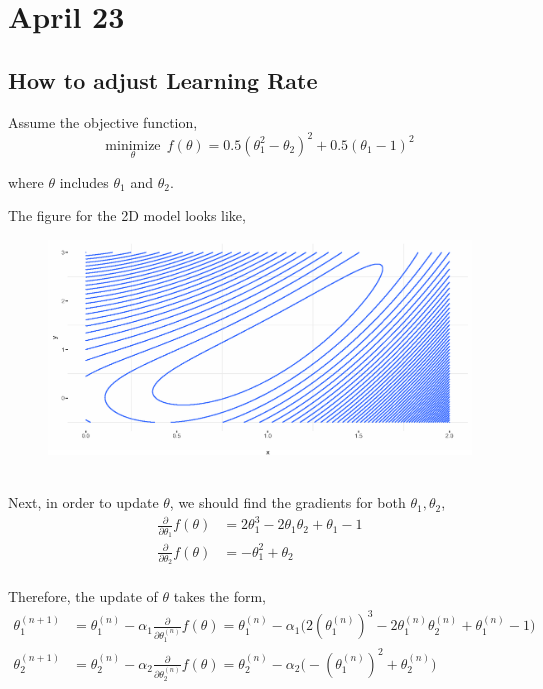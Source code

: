 \documentclass[12pt,a4paper]{article}%
\theoremstyle{definition}
\theoremstyle{plain}
\numberwithin{equation}{section}
\begin{document}
\section{April 23}
\subsection{How to adjust Learning Rate}

Assume the objective function,
\begin{equation}
\underset{\theta}{\text{minimize}}~~ f(\theta) = 0.5(\theta_{1}^{2}-\theta_{2})^{2} + 0.5(\theta_{1}-1)^{2}
\end{equation}

where $\theta$ includes $\theta_{1}$ and $\theta_{2}$.

The figure for the 2D model looks like,
\begin{figure}[H]
\centering
{}
\includegraphics[scale=0.8]{images//plot.eps}
\\~\\
\end{figure}


Next, in order to update $\theta$, we should find the gradients for both $\theta_{1},\theta_{2}$, 
\begin{align*}
\frac{\partial}{\partial \theta_{1}}f(\theta) &= 2\theta_{1}^{3} - 2 \theta_{1} \theta_{2} + \theta_{1} -1 \\
\frac{\partial}{\partial \theta_{2}}f(\theta) &=  - \theta_{1}^{2} + \theta_{2} \\
\end{align*}

Therefore, the update of $\theta$ takes the form,
\begin{align*}
\theta_{1}^{(n+1)} &= \theta_{1}^{(n)} - \alpha_{1} \frac{\partial}{\partial \theta_{1}^{(n)}}f(\theta)= \theta_{1}^{(n)} - \alpha_{1} \big( 2(\theta_{1}^{(n)})^{3} - 2 \theta_{1}^{(n)} \theta_{2}^{(n)} + \theta_{1}^{(n)} -1 \big)   \\
\theta_{2}^{(n+1)} &= \theta_{2}^{(n)} - \alpha_{2} \frac{\partial}{\partial \theta_{2}^{(n)}}f(\theta)= \theta_{2}^{(n)} - \alpha_{2} \big( - (\theta_{1}^{(n)})^{2} + \theta_{2}^{(n)} \big)
\end{align*}
\end{document}

